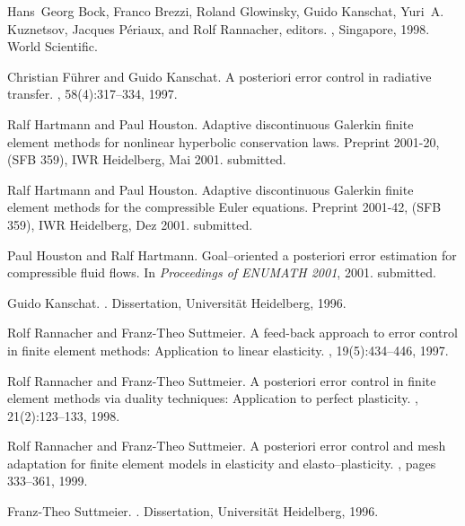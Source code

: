 \documentclass{article}
\begin{document}
\begin{thebibliography}{10}
Hans~Georg Bock, Franco Brezzi, Roland Glowinsky, Guido Kanschat, Yuri~A.
  Kuznetsov, Jacques P\'eriaux, and Rolf Rannacher, editors.
, Singapore, 1998. World
  Scientific.

Christian F{\"u}hrer and Guido Kanschat.
\newblock A posteriori error control in radiative transfer.
, 58(4):317--334, 1997.

Ralf Hartmann and Paul Houston.
\newblock Adaptive discontinuous {G}alerkin finite element methods for
  nonlinear hyperbolic conservation laws.
\newblock Preprint 2001-20, (SFB 359), IWR Heidelberg, Mai 2001.
\newblock submitted.

Ralf Hartmann and Paul Houston.
\newblock Adaptive discontinuous {G}alerkin finite element methods for the
  compressible {E}uler equations.
\newblock Preprint 2001-42, (SFB 359), IWR Heidelberg, Dez 2001.
\newblock submitted.

Paul Houston and Ralf Hartmann.
\newblock Goal--oriented a posteriori error estimation for compressible fluid
  flows.
\newblock In {\em Proceedings of ENUMATH 2001}, 2001.
\newblock submitted.

Guido Kanschat.
.
\newblock Dissertation, Universit{\"a}t Heidelberg, 1996.

Rolf Rannacher and Franz-Theo Suttmeier.
\newblock A feed-back approach to error control in finite element methods:
  Application to linear elasticity.
, 19(5):434--446, 1997.

Rolf Rannacher and Franz-Theo Suttmeier.
\newblock A posteriori error control in finite element methods via duality
  techniques: Application to perfect plasticity.
, 21(2):123--133, 1998.

Rolf Rannacher and Franz-Theo Suttmeier.
\newblock A posteriori error control and mesh adaptation for finite element
  models in elasticity and elasto--plasticity.
, pages 333--361, 1999.

Franz-Theo Suttmeier.
.
\newblock Dissertation, Universit{\"a}t Heidelberg, 1996.

\end{thebibliography}
\end{document}
